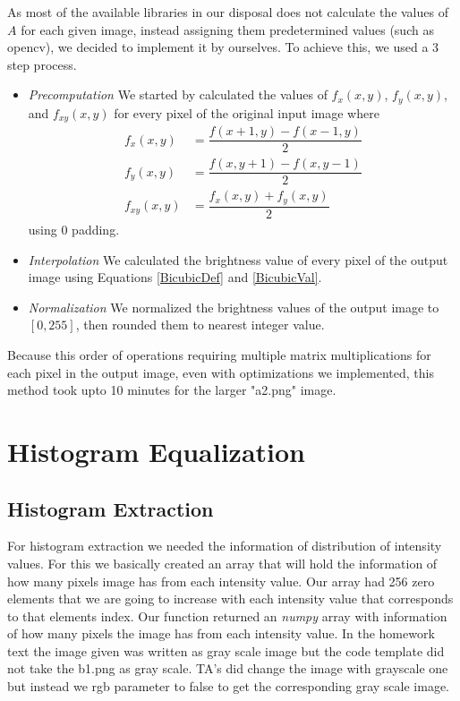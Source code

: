 \documentclass[conference]{IEEEtran}
\begin{document}
As most of the available libraries in our disposal does not calculate the values of $A$ for each given image, instead assigning them predetermined values (such as opencv), we decided to implement it by ourselves. To achieve this, we used a 3 step process.
\begin{itemize}
	\item \textit{Precomputation} We started by calculated the values of $f_x(x,y)$, $f_y(x,y)$, and $f_{xy}(x,y)$ for every pixel of the original input image where
	\begin{align}
		f_x(x,y) &= \dfrac{f(x+1,y)-f(x-1,y)}{2}\\
		f_y(x,y) &= \dfrac{f(x,y+1)-f(x,y-1)}{2}\\
		f_{xy}(x,y) &= \dfrac{f_x(x,y)+f_y(x,y)}{2}
	\end{align}
	using $0$ padding.
	\item \textit{Interpolation} We calculated the brightness value of every pixel of the output image using Equations \ref{BicubicDef} and \ref{BicubicVal}.
	\item \textit{Normalization} We normalized the brightness values of the output image to $[0,255]$, then rounded them to nearest integer value.
\end{itemize}

Because this order of operations requiring multiple matrix multiplications for each pixel in the output image, even with optimizations we implemented, this method took upto 10 minutes for the larger "a2.png" image.

\section{Histogram Equalization}


\subsection{Histogram Extraction}
For histogram extraction we needed the information of distribution of intensity values. For this we basically created an array that will hold the information of how many pixels image has from each intensity value. Our array had 256 zero elements that we are going to increase with each intensity value that corresponds to that elements index. Our function returned an \emph{numpy} array with information of how many pixels the image has from each intensity value. In the homework text the image given was written as gray scale image but the code template did not take the b1.png as gray scale. TA's did change the image with grayscale one but instead we rgb parameter to false to get the corresponding gray scale image.
\end{document}
